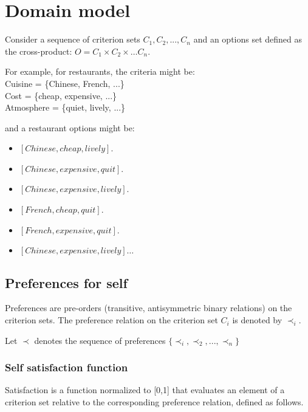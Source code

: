 \documentclass{article}
\begin{document}
		\title{\vskip -10pt}
		
		\author{Lydia Ould Ouali, Charles Rich \and
		Nicolas Sabouret }
		
	
	\section{Domain model}
		Consider a sequence of criterion sets $C_1, C_2, ..., C_n$ and an options set defined as the cross-product:
				$O = C_1 \times C_2 \times \ldots C_n$.
		
		For example, for restaurants, the criteria might be: \\
			Cuisine = \{Chinese, French, ...\} \\
			Cost = \{cheap, expensive, ...\} \\
			Atmosphere = \{quiet, lively, ...\} \\
		
	\par and a restaurant options might be: 
		\begin{itemize}
			\item $[Chinese, cheap, lively]$. 
			 \item $[Chinese, expensive, quit]$.   
			 \item $[Chinese, expensive, lively]$.
			 \item $[French, cheap, quit]$.  
			 \item $[French, expensive, quit]$.   
			 \item $[Chinese, expensive, lively]\ldots$ 
		\end{itemize}
  
	 
	
	\subsection{Preferences for self}
	Preferences are pre-orders (transitive, antisymmetric binary
	relations) on the criterion sets.  The preference relation on the
	criterion set $C_i$ is denoted by $\prec_i$.
	
	Let $\prec$ denotes the sequence of preferences $\{ \prec_i, \prec_2, ..., \prec_n\}$
	
		\subsubsection{	Self satisfaction function} 
	
	Satisfaction is a function normalized to [0,1] that evaluates an element of a criterion set relative to the corresponding preference relation, defined as follows.
	
\end{document}
